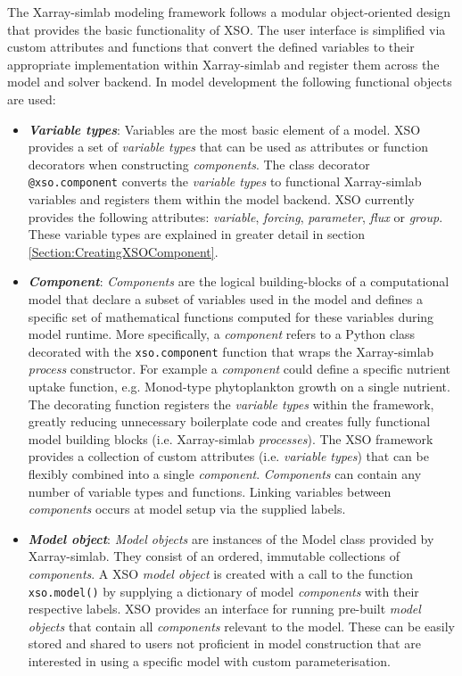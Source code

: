 \documentclass[journal abbreviation, manuscript]{copernicus}
\begin{document}
The Xarray-simlab modeling framework follows a modular object-oriented design that provides the basic functionality of XSO. The user interface is simplified via custom attributes and functions that convert the defined variables to their appropriate implementation within Xarray-simlab and register them across the model and solver backend. In model development the following functional objects are used:
\begin{itemize}
    \item \textbf{\textit{Variable types}}: 
    Variables are the most basic element of a model. XSO provides a set of \textit{variable types} that can be used as attributes or function decorators when constructing \textit{components}. The class decorator \texttt{@xso.component} converts the \textit{variable types} to functional Xarray-simlab variables and registers them within the model backend. XSO currently provides the following attributes: \textit{variable}, \textit{forcing}, \textit{parameter}, \textit{flux} or \textit{group}. These variable types are explained in greater detail in section \ref{Section:CreatingXSOComponent}.
    
    \item \textbf{\textit{Component}}: 
    \textit{Components} are the logical building-blocks of a computational model that declare a subset of variables used in the model and defines a specific set of mathematical functions computed for these variables during model runtime. More specifically, a \textit{component} refers to a Python class decorated with the \texttt{xso.component} function that wraps the Xarray-simlab \textit{process} constructor. For example a \textit{component} could define a specific nutrient uptake function, e.g. Monod-type phytoplankton growth on a single nutrient.
    The decorating function registers the \textit{variable types} within the framework, greatly reducing unnecessary boilerplate code and creates fully functional model building blocks (i.e. Xarray-simlab \textit{processes}).
    The XSO framework provides a collection of custom attributes (i.e. \textit{variable types}) that can be flexibly combined into a single \textit{component}. \textit{Components} can contain any number of variable types and functions. Linking variables between \textit{components} occurs at model setup via the supplied labels.
    
    \item \textbf{\textit{Model object}}: 
    \textit{Model objects} are instances of the Model class provided by Xarray-simlab. They consist of an ordered, immutable collections of \textit{components}. A XSO \textit{model object} is created with a call to the function \texttt{xso.model()} by supplying a dictionary of model \textit{components} with their respective labels. XSO provides an interface for running pre-built \textit{model objects} that contain all \textit{components} relevant to the model. These can be easily stored and shared to users not proficient in model construction that are interested in using a specific model with custom parameterisation.
    

\end{itemize}
\end{document}
